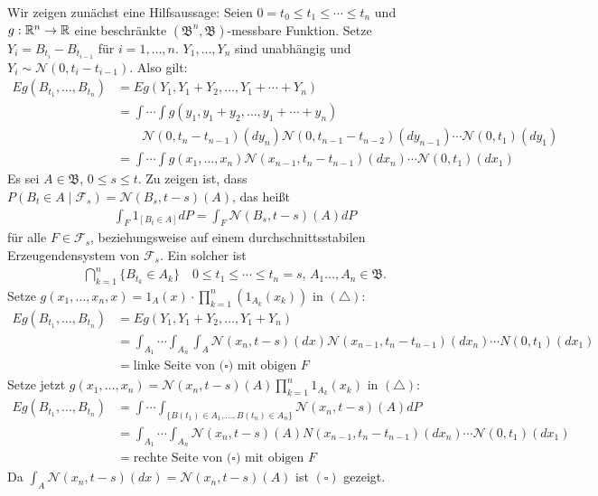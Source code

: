 \documentclass[a4paper,twoside,DIV15,BCOR12mm]{scrbook}
\newcommand{\cF}{\mathcal F}
\newcommand{\borel}{{\mathfrak B}}
\begin{document}
\begin{beweis}
Wir zeigen zunächst eine Hilfsaussage: Seien $0=t_0\le t_1\le \cdots \le t_n$ und $g:\mathbb{R}^n\to \mathbb{R}$ eine beschränkte $(\borel^n,\borel)$-messbare Funktion. Setze $Y_i=B_{t_i}-B_{t_{i-1}}$ für $i=1,\ldots,n$. $Y_1,\ldots,Y_n$ sind unabhängig und $Y_i\sim\mathcal N(0,t_i-t_{i-1})$. Also gilt:
\begin{align*}
Eg(B_{t_1},\ldots,B_{t_n}) &= Eg(Y_1,Y_1+Y_2,\ldots,Y_1+\cdots +Y_n) \tag{$\triangle$}\\
&= 
\int\cdots\int g(y_1,y_1+y_2,\ldots,y_1+\cdots +y_n) \\
&\quad\quad 
\mathcal N(0,t_n-t_{n-1})(dy_n) \mathcal N(0,t_{n-1}-t_{n-2})(dy_{n-1})\cdots \mathcal N(0,t_1)(dy_1)\\
&= \int\cdots\int g(x_1,\ldots,x_n) \mathcal N(x_{n-1},t_n-t_{n-1})(dx_n) \cdots \mathcal N(0,t_1)(dx_1)
\end{align*}
Es sei $A\in \borel$, $0\le s\le t$. Zu zeigen ist, dass $P(B_t\in A\mid \cF_s) = \mathcal N(B_s,t-s)(A)$, das heißt
\begin{align*}
\int_F 1_{[B_t\in A]} dP = \int_F\mathcal N(B_s,t-s)(A)dP \tag{$\square$}
\end{align*}
für alle $F\in \cF_s$, beziehungsweise auf einem durchschnittsstabilen Erzeugendensystem von $\cF_s$. Ein solcher ist
\begin{align*}
\bigcap_{k=1}^n \{B_{t_k}\in A_k\}\quad 0\le t_1\le \cdots\le t_n=s,\, A_1\ldots,A_n\in \borel.
\end{align*}
Setze $g(x_1,\ldots,x_n,x)= 1_A(x)\cdot \prod_{k=1}^n(1_{A_k}(x_k))$ in $(\triangle)$:
\begin{align*}
Eg(B_{t_1},\ldots,B_{t_n}) &= Eg(Y_1,Y_1+Y_2,\ldots,Y_1+Y_n) \\
&=\int_{A_1}\cdots\int_{A_n}\int_A \mathcal N(x_n,t-s)(dx)\mathcal N(x_{n-1},t_n-t_{n-1})(dx_n)\cdots N(0,t_1)(dx_1) \\
&= \text{linke Seite von ($\square$) mit obigen $F$}
\end{align*}
Setze jetzt $g(x_1,\ldots,x_n) = \mathcal N(x_n,t-s)(A)\prod_{k=1}^n 1_{A_k}(x_k)$ in $(\triangle)$:
\begin{align*}
Eg(B_{t_1},\ldots,B_{t_n}) &= \int\cdots\int_{\{B(t_1)\in A_1,\ldots,B(t_n)\in A_n\}} \mathcal N(x_n,t-s)(A) dP\\
&= \int_{A_1}\cdots\int_{A_n} \mathcal N (x_n,t-s)(A) N(x_{n-1},t_n-t_{n-1})(dx_n) \cdots \mathcal N(0,t_1)(dx_1)\\
&= \text{rechte Seite von ($\square$) mit obigen $F$}
\end{align*}
Da $\int_A\mathcal N(x_n,t-s)(dx) = \mathcal N(x_n,t-s)(A)$ ist $(\square)$ gezeigt.
\end{beweis}
\end{document}

